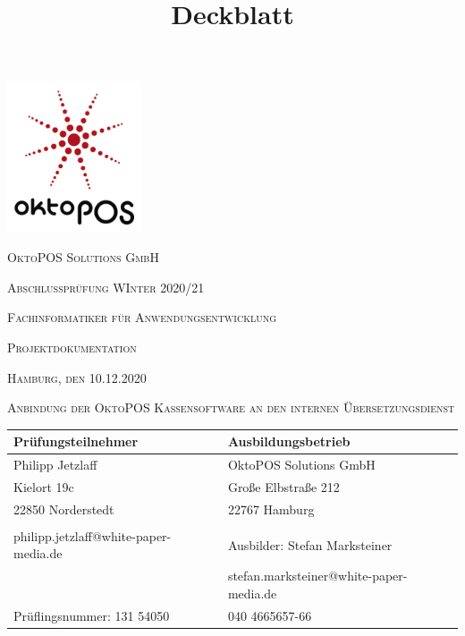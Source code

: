 \documentclass[11pt]{article}
\title{Deckblatt}
\begin{document}
\begin{titlepage}
	\centering
	\includegraphics[width=0.30\textwidth]{OktoPOS.png}\par\vspace{0.5cm}
	{\scshape\LARGE OktoPOS Solutions GmbH \par}
	\vspace{1cm}
	{\scshape\small Abschlussprüfung WInter 2020/21\par}
	\vspace{0.5cm}
	{\scshape\small Fachinformatiker für Anwendungsentwicklung\\}
	\vspace{1cm}
		{\scshape\LARGE Projektdokumentation \par}
		\vspace{0.5cm}
		{\scshape\small Hamburg, den 10.12.2020\par}
    \vspace{1cm}
    {\scshape\large Anbindung der OktoPOS Kassensoftware an den internen Übersetzungsdienst\par}
    \vspace{2cm}
\vspace{3cm}
{\Large\itshape \par}
\vfill
\par
\begin{tabular}{| l | l |}
	\hline
	Prüfungsteilnehmer & Ausbildungsbetrieb \\
	\hline
	Philipp Jetzlaff & OktoPOS Solutions GmbH\\
	Kielort 19c & Große Elbstraße 212 \\
	22850 Norderstedt & 22767 Hamburg\\
	&\\
	philipp.jetzlaff@white-paper-media.de & Ausbilder: Stefan Marksteiner\\
	 & stefan.marksteiner@white-paper-media.de\\
	 Prüflingsnummer: 131 54050 &040 4665657-66\\
	\hline 
\end{tabular}



	\vfill
	
\end{titlepage}
\end{document}
